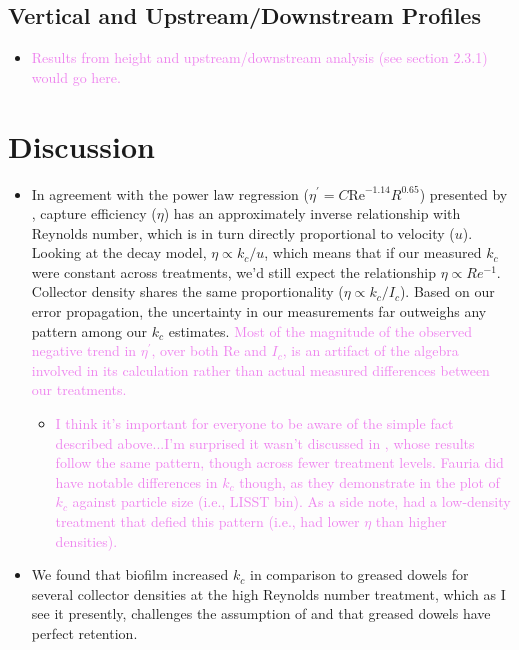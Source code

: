 \documentclass{article}
\newcommand\Rey{\mathrm{Re}}
\begin{document}
\subsection{Vertical and Upstream/Downstream Profiles}

\begin{itemize}
    \item \textcolor{violet}{Results from height and upstream/downstream analysis (see section 2.3.1) would go here.}
\end{itemize}

\section{Discussion}

\begin{itemize}
    \item In agreement with the power law regression ($\eta^\prime = C\Rey^{-1.14}R^{0.65}$) presented by \cite{Fauria_2015}, capture efficiency ($\eta$) has an approximately inverse relationship with Reynolds number, which is in turn directly proportional to velocity ($u$). Looking at the decay model, $\eta \propto k_c/u$, which means that if our measured $k_c$ were constant across treatments, we'd still expect the relationship $\eta \propto Re^{-1}$. Collector density shares the same proportionality ($\eta \propto k_c/I_c$). Based on our error propagation, the uncertainty in our measurements far outweighs any pattern among our $k_c$ estimates. \textcolor{violet}{Most of the magnitude of the observed negative trend in $\eta^\prime$, over both $\Rey$ and $I_c$, is an artifact of the algebra involved in its calculation rather than actual measured differences between our treatments.} 
        \begin{itemize}
            \item  \textcolor{violet}{I think it's important for everyone to be aware of the simple fact described above...I'm surprised it wasn't discussed in \cite{Fauria_2015}, whose results follow the same pattern, though across fewer treatment levels. Fauria did have notable differences in $k_c$ though, as they demonstrate in the plot of $k_c$ against particle size (i.e., LISST bin). As a side note, \cite{Purich_2007} had a low-density treatment that defied this pattern (i.e., had lower $\eta$ than higher densities).} 
        \end{itemize}
    \item We found that biofilm increased $k_c$ in comparison to greased dowels for several collector densities at the high Reynolds number treatment, which as I see it presently, challenges the assumption of \cite{Palmer_2004} and \cite{Fauria_2015} that greased dowels have perfect retention.

\end{itemize}
\end{document}
